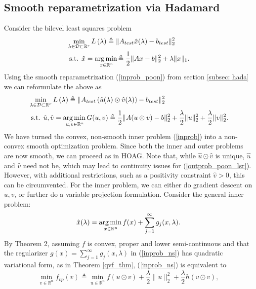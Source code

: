 \documentclass[11pt, twoside]{report}
\begin{document}
\subsection{Smooth reparametrization via Hadamard}
Consider the bilevel least squares problem
\begin{align} 
&\min _{\lambda \in \mathcal{D} \subset \mathbb{R}^r} L\left(\lambda \right) \triangleq \|A_{test} \hat{x}(\lambda) - b_{test}\|_2^2 \label{outprob_lsr}\\
&\text { s.t. } \hat{x} = \underset{x \in \mathbb{R}^{n}} {\operatorname*{arg\, min \,}}{ \triangleq \frac{1}{2}\|Ax-b\|_2^2 + \lambda \|x\|_1}. \label{inprob_lsr}
\end{align}
Using the smooth reparametrization (\ref{inprob_poon}) from section \ref{subsec: hada} we can reformulate the above as
\begin{align} 
&\min _{\lambda \in \mathcal{D} \subset \mathbb{R}^r} L\left(\lambda \right) \triangleq \|A_{test} \left(\hat{u}(\lambda) \odot \hat{v}(\lambda) \right) - b_{test}\|_2^2 \label{outprob_poon_lsr}\\
&\text { s.t. } \hat{u},\hat{v} = \underset{u,v \in \mathbb{R}^{n}} {\operatorname*{arg\, min \,}}{G(u,v)} \triangleq \frac{1}{2}\|A(u \odot v)-b\|_2^2 + \frac{\lambda}{2} \|u\|^2_2 + \frac{\lambda}{2} \|v\|^2_2. \label{inprob_poon_lsr}
\end{align}
We have turned the convex, non-smooth inner problem (\ref{inprob}) into a non-convex smooth optimization problem. Since both the inner and outer problems are now smooth, we can proceed as in HOAG\cite{pedregosa2016hyperparameter}. Note that, while $\hat{u} \odot \hat{v}$ is unique, $\hat{u}$ and $\hat{v}$ need not be, which may lead to continuity issues for (\ref{outprob_poon_lsr}). However, with additional restrictions, such as a positivity constraint $\hat{v} > 0$, this can be circumvented. For the inner problem, we can either do gradient descent on $u,v$, or further do a variable projection formulation. Consider the general inner problem:
\begin{equation} \label{inprob_ns}
    \hat{x}(\lambda) =\underset{x \in \mathbb{R}^{n}} {\operatorname*{arg\, min \,}}  f(x) + \sum_{j=1}^\infty g_j(x,\lambda).
\end{equation}
By Theorem 2\cite{poon}, assuming $f$ is convex, proper and lower semi-continuous and that the regularizer $g(x) = \sum_{j=1}^\infty g_j(x,\lambda)$ in (\ref{inprob_ns}) has quadratic variational form, as in Theorem \ref{qvf_thm}, (\ref{inprob_ns}) is equivalent to
\begin{equation} \label{noncvx_varpro}
    \min_{v \in \mathbb{R}^n} f_{vp}(v) \triangleq \min_{u \in \mathbb{R}^n}{f(u \odot v) + \frac{\lambda}{2} \|u\|^2_2 + \frac{\lambda}{2} h(v \odot v)},
\end{equation}
\end{document}
